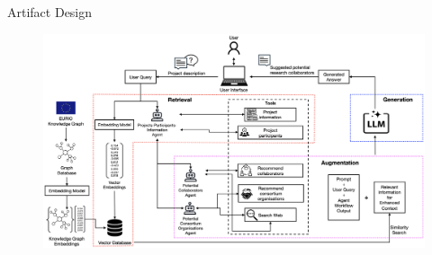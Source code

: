 \begin{frame}{Artifact Design}
    
    \begin{figure}
        \centering
        \includegraphics[width=\textwidth]{../img/architecture/proposed-system-graphRAG.png}
    \end{figure}

\end{frame}